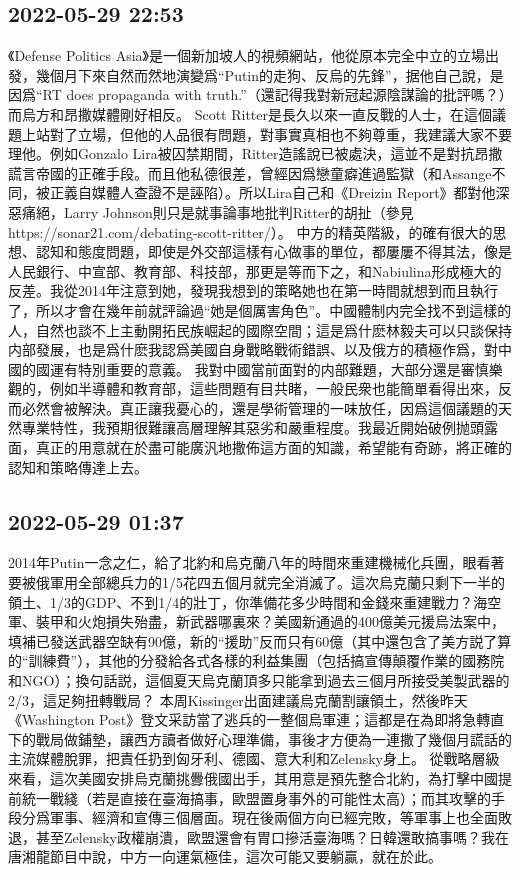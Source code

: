 \documentclass[twocolumn]{ctexart}
\begin{document}
\subsection*{2022-05-29 22:53}

《Defense Politics Asia》是一個新加坡人的視頻網站，他從原本完全中立的立場出發，幾個月下來自然而然地演變爲“Putin的走狗、反烏的先鋒”，据他自己說，是因爲“RT does propaganda with truth.”（還記得我對新冠起源陰謀論的批評嗎？）而烏方和昂撒媒體剛好相反。
Scott Ritter是長久以來一直反戰的人士，在這個議題上站對了立場，但他的人品很有問題，對事實真相也不夠尊重，我建議大家不要理他。例如Gonzalo Lira被囚禁期間，Ritter造謠說已被處決，這並不是對抗昂撒謊言帝國的正確手段。而且他私德很差，曾經因爲戀童癖進過監獄（和Assange不同，被正義自媒體人查證不是誣陷）。所以Lira自己和《Dreizin Report》都對他深惡痛絕，Larry Johnson則只是就事論事地批判Ritter的胡扯（參見https://sonar21.com/debating-scott-ritter/）。
中方的精英階級，的確有很大的思想、認知和態度問題，即使是外交部這樣有心做事的單位，都屢屢不得其法，像是人民銀行、中宣部、教育部、科技部，那更是等而下之，和Nabiulina形成極大的反差。我從2014年注意到她，發現我想到的策略她也在第一時間就想到而且執行了，所以才會在幾年前就評論過“她是個厲害角色”。中國體制内完全找不到這樣的人，自然也談不上主動開拓民族崛起的國際空間；這是爲什麽林毅夫可以只談保持内部發展，也是爲什麽我認爲美國自身戰略戰術錯誤、以及俄方的積極作爲，對中國的國運有特別重要的意義。
我對中國當前面對的内部難題，大部分還是審慎樂觀的，例如半導體和教育部，這些問題有目共睹，一般民衆也能簡單看得出來，反而必然會被解決。真正讓我憂心的，還是學術管理的一味放任，因爲這個議題的天然專業特性，我預期很難讓高層理解其惡劣和嚴重程度。我最近開始破例抛頭露面，真正的用意就在於盡可能廣汎地撒佈這方面的知識，希望能有奇跡，將正確的認知和策略傳達上去。
\subsection*{2022-05-29 01:37}

2014年Putin一念之仁，給了北約和烏克蘭八年的時間來重建機械化兵團，眼看著要被俄軍用全部總兵力的1/5花四五個月就完全消滅了。這次烏克蘭只剩下一半的領土、1/3的GDP、不到1/4的壯丁，你準備花多少時間和金錢來重建戰力？海空軍、裝甲和火炮損失殆盡，新武器哪裏來？美國新通過的400億美元援烏法案中，填補已發送武器空缺有90億，新的“援助”反而只有60億（其中還包含了美方説了算的“訓練費”），其他的分發給各式各樣的利益集團（包括搞宣傳顛覆作業的國務院和NGO）；換句話説，這個夏天烏克蘭頂多只能拿到過去三個月所接受美製武器的2/3，這足夠扭轉戰局？
本周Kissinger出面建議烏克蘭割讓領土，然後昨天《Washington Post》登文采訪當了逃兵的一整個烏軍連；這都是在為即將急轉直下的戰局做鋪墊，讓西方讀者做好心理準備，事後才方便為一連撒了幾個月謊話的主流媒體脫罪，把責任扔到匈牙利、德國、意大利和Zelensky身上。
從戰略層級來看，這次美國安排烏克蘭挑釁俄國出手，其用意是預先整合北約，為打擊中國提前統一戰綫（若是直接在臺海搞事，歐盟置身事外的可能性太高）；而其攻擊的手段分爲軍事、經濟和宣傳三個層面。現在後兩個方向已經完敗，等軍事上也全面敗退，甚至Zelensky政權崩潰，歐盟還會有胃口摻活臺海嗎？日韓還敢搞事嗎？我在唐湘龍節目中說，中方一向運氣極佳，這次可能又要躺贏，就在於此。
\end{document}
